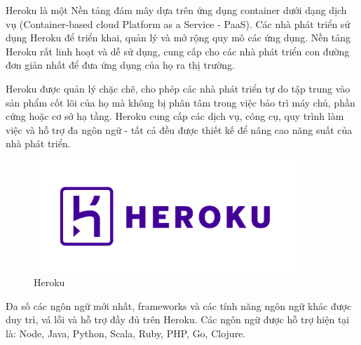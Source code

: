 Heroku là một Nền tảng đám mây dựa trên ứng dụng container dưới dạng dịch vụ (Container-based cloud Platform as a Service - PaaS). Các nhà phát triển sử dụng Heroku để triển khai, quản lý và mở rộng quy mô các ứng dụng. Nền tảng Heroku rất linh hoạt và dễ sử dụng, cung cấp cho các nhà phát triển con đường đơn giản nhất để đưa ứng dụng của họ ra thị trường.\par

Heroku được quản lý chặc chẽ, cho phép các nhà phát triển tự do tập trung vào sản phẩm cốt lõi của họ mà không bị phân tâm trong việc bảo trì máy chủ, phần cứng hoặc cơ sở hạ tầng. Heroku cung cấp các dịch vụ, công cụ, quy trình làm việc và hỗ trợ đa ngôn ngữ - tất cả đều được thiết kế để nâng cao năng suất của nhà phát triển.\par

\begin{figure}[!ht]
    \begin{center}
        \includegraphics[width=10cm]{Image/Technical/heroku.png}
        \caption{Heroku}
        \label{heroku}
    \end{center}
\end{figure}

Đa số các ngôn ngữ mới nhất, frameworks và các tính năng ngôn ngữ khác được duy trì, vá lỗi và hỗ trợ đầy đủ trên Heroku. Các ngôn ngữ được hỗ trợ hiện tại là: Node, Java, Python, Scala, Ruby, PHP, Go, Clojure.\par

